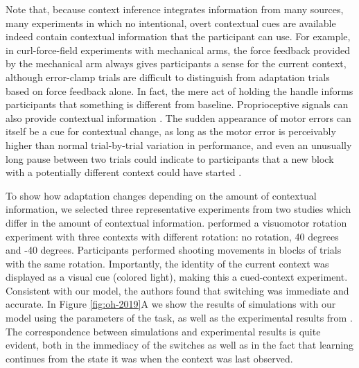 \documentclass[a4paper,doc,floatsintext,natbib]{apa6}
\def \fref #1{Figure \ref{#1}}     %
\begin{document}
Note that, because context inference integrates information from many sources, many experiments in which no intentional, overt contextual cues are available indeed contain contextual information that the participant can use. For example, in curl-force-field experiments with mechanical arms, the force feedback provided by the mechanical arm always gives participants a sense for the current context, although error-clamp trials are difficult to distinguish from adaptation trials based on force feedback alone. In fact, the mere act of holding the handle informs participants that something is different from baseline. Proprioceptive signals can also provide contextual information \cite{Dizio_Motor_1995,Shadmehr_Adaptive_1994}. The sudden appearance of motor errors can itself be a cue for contextual change, as long as the motor error is perceivably higher than normal trial-by-trial variation in performance, and even an unusually long pause between two trials could indicate to participants that a new block with a potentially different context could have started \cite[e.g.][]{Ethier_Spontaneous_2008}.

To show how adaptation changes depending on the amount of contextual information, we selected three representative experiments from two studies which differ in the amount of contextual information. \cite{Kim_Neural_2015} performed a visuomotor rotation experiment with three contexts with different rotation: no rotation, 40 degrees and -40 degrees. Participants performed shooting movements in blocks of trials with the same rotation. Importantly, the identity of the current context was displayed as a visual cue (colored light), making this a cued-context experiment. Consistent with our model, the authors found that switching was immediate and accurate. In \fref{fig:oh-2019}A we show the results of simulations with our model using the parameters of the task, as well as the experimental results from \cite{Kim_Neural_2015}. The correspondence between simulations and experimental results is quite evident, both in the immediacy of the switches as well as in the fact that learning continues from the state it was when the context was last observed.
\end{document}

